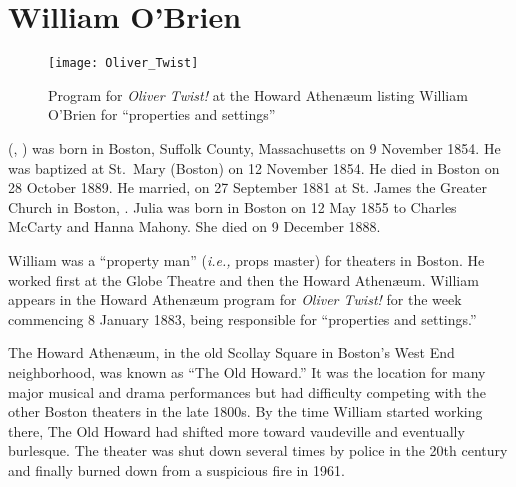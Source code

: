 \section{William O'Brien}\label{per:William3OBrien}

\begin{figure}[p]
	\centering
	\texttt{[image: Oliver\_Twist]}
	\caption{Program for \textit{Oliver Twist!} at the Howard Athen\ae um listing William O'Brien for ``properties and settings''}
	\label{fig:OliverTwist}
\end{figure}

 (, ) was born in Boston, Suffolk County, Massa\-chu\-setts on 9 November 1854.\cite{William3OBrienBirth} He was baptized at St.\ Mary (Boston) on 12 November 1854.\cite{William3OBrienBaptism} He died in Boston on 28 October 1889.\cite{William3OBrienDeath:1} He married, on 27 September 1881 at St. James the Greater Church in Boston, .\cite{William3OBrienMarriage} Julia was born in Boston on 12 May 1855 to Charles McCarty and Hanna Mahony.\cite{JuliaMcCartyBaptism} She died on 9 December 1888.\cite{JuliaMcCartyDeath:1}

William was a ``property man'' (\textit{i.e.,} props master\cite{PropertyMan}) for theaters in Boston. He worked first at the Globe Theatre\cite{WilliamOBrien1880} and then the Howard Athen\ae um.\cite{WilliamOBrien1883} William appears in the Howard Athen\ae um program for \textit{Oliver Twist!} for the week commencing 8 January 1883, being responsible for ``properties and settings.''\cite{William3OBrienProgram} 

The Howard Athen\ae um, in the old Scollay Square in Boston's West End neighborhood, was known as ``The Old Howard.'' It was the location for many major musical and drama performances but had difficulty competing with the other Boston theaters in the late 1800s. By the time William started working there, The Old Howard had shifted more toward vaudeville and eventually burlesque. The theater was shut down several times by police in the 20th century and finally burned down from a suspicious fire in 1961.\cite{HowardAthenaeum}

